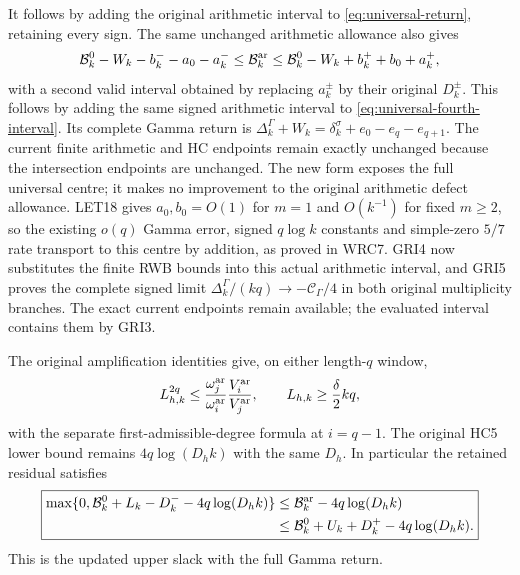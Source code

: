 \documentclass[11pt,a4paper]{article}
\begin{document}
It follows by adding the original arithmetic interval to
\eqref{eq:universal-return}, retaining every sign.
The same unchanged arithmetic allowance also gives
\begin{equation}
 \mathcal B_k^0-W_k-b_k^--a_0-a_k^-
 \leq\mathcal B_k^{\rm ar}
 \leq\mathcal B_k^0-W_k+b_k^++b_0+a_k^+,
 \label{eq:universal-centred-arithmetic}
\end{equation}
with a second valid interval obtained by replacing $a_k^\pm$
by their original $D_k^\pm$. This follows by adding the same
signed arithmetic interval to \eqref{eq:universal-fourth-interval}.
Its complete Gamma return is
$\Delta_k^\Gamma+W_k=\delta_k^\sigma+e_0-e_q-e_{q+1}$.
The current finite arithmetic and HC endpoints remain exactly
unchanged because the intersection endpoints are unchanged.
The new form exposes the full universal centre; it makes no
improvement to the original arithmetic defect allowance.
LET18 gives $a_0,b_0=O(1)$ for $m=1$ and $O(k^{-1})$
for fixed $m\geq2$, so the existing $o(q)$ Gamma error,
signed $q\log k$ constants and simple-zero $5/7$ rate
transport to this centre by addition, as proved in WRC7.
GRI4 now substitutes the finite RWB bounds into this actual
arithmetic interval, and GRI5 proves the complete signed limit
$\Delta_k^\Gamma/(kq)\to-\mathcal C_\Gamma/4$ in both
original multiplicity branches. The exact current endpoints
remain available; the evaluated interval contains them by GRI3.

The original amplification identities give, on either length-$q$ window,
\begin{equation}
 L_{h,k}^{2q}\le
 \frac{\omega_j^{\rm ar}}{\omega_i^{\rm ar}}
 \frac{V_i^{\rm ar}}{V_j^{\rm ar}},\qquad
 L_{h,k}\ge\frac\delta2 kq,
\end{equation}
with the separate first-admissible-degree formula at $i=q-1$.
The original HC5 lower bound remains $4q\log(D_hk)$ with the
same $D_h$. In particular the retained residual satisfies
\begin{equation}
 \boxed{\begin{aligned}
 \max\{0,\mathcal B_k^0+L_k-D_k^--4q\log(D_hk)\}
 &\le\mathcal B_k^{\rm ar}-4q\log(D_hk)\\
 &\le\mathcal B_k^0+U_k+D_k^+-4q\log(D_hk).
 \end{aligned}}
\end{equation}
This is the updated upper slack with the full Gamma return.
\end{document}
